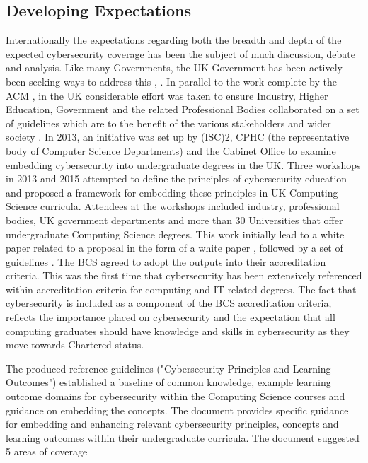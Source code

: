\documentclass[conference]{IEEEtran}
\begin{document}
\subsection{Developing Expectations}
Internationally the expectations regarding both the breadth and depth of the expected cybersecurity coverage has been the subject of much discussion, debate and analysis. Like many Governments, the UK Government has been actively been seeking ways to address this \cite{UKCabinetOffice}, \cite{UKCabinetOffice2014}. In parallel to the work complete by the ACM \cite{ACM2013a}, in the UK considerable effort was taken to ensure Industry, Higher Education, Government and the related Professional Bodies collaborated on a set of guidelines which are to the benefit of the various stakeholders and wider society \cite{Irons2016}. In 2013, an initiative was set up by (ISC)2, CPHC (the representative body of Computer Science Departments) and the Cabinet Office to examine embedding cybersecurity into undergraduate degrees in the UK. Three workshops in 2013 and 2015 attempted to define the principles of cybersecurity education and proposed a framework for embedding these principles in UK Computing Science curricula. Attendees at the workshops included industry, professional bodies, UK government departments and more than 30 Universities that offer undergraduate Computing Science degrees. This work initially lead to a white paper related to a proposal in the form of a white paper \cite{CPHCISC2014}, followed by a set of guidelines \cite{CPHCISC2}. The BCS agreed to adopt the outputs into their accreditation criteria. This was the first time that cybersecurity has been extensively referenced within accreditation criteria for computing and IT-related degrees. The fact that cybersecurity is included as a  component of the BCS accreditation criteria, reflects the importance placed on cybersecurity and the expectation that all computing graduates should have knowledge and skills in cybersecurity as they move towards Chartered status.

The produced reference guidelines ("Cybersecurity Principles and Learning Outcomes") \cite{CPHCISC2} established a baseline of common knowledge, example learning outcome domains for cybersecurity within the Computing Science courses and guidance on embedding the concepts. The document provides specific guidance for embedding and enhancing relevant cybersecurity principles, concepts and learning outcomes within their undergraduate curricula. The document suggested 5 areas of coverage 
\end{document}

